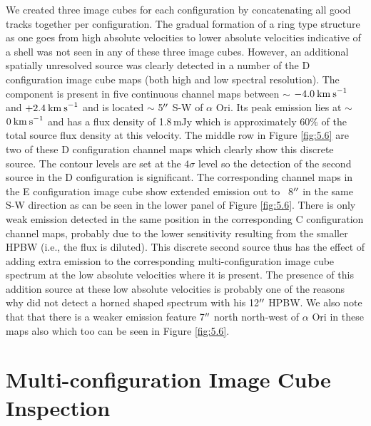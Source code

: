 We created three image cubes for each configuration by concatenating all good tracks together per configuration. The gradual formation of a ring type structure as one goes from high absolute velocities to lower absolute velocities indicative of a shell was not seen in any of these three image cubes. However, an additional spatially unresolved source was clearly detected in a number of the D configuration image cube maps (both high and low spectral resolution). The component is present in five continuous channel maps between $\sim$ $-4.0\>{\rm km\>s}^{-1}$ and $+2.4\>{\rm km\>s}^{-1}$ and is located $\sim$ 5$^{\prime\prime}$ S-W of $\alpha$ Ori. Its peak emission lies at $\sim$ $0\>{\rm km\>s}^{-1}$ and has a flux density of 1.8\,mJy which is approximately 60$\%$ of the total source flux density at this velocity. The middle row in Figure \ref{fig:5.6} are two of these D configuration channel maps which clearly show this discrete source. The contour levels are set at the $4\sigma$ level so the detection of the second source in the D configuration is significant. The corresponding channel maps in the E configuration image cube show extended emission out to ~8$^{\prime\prime}$ in the same S-W direction as can be seen in the lower panel of Figure \ref{fig:5.6}. There is only weak emission detected in the same position in the corresponding C configuration channel maps, probably due to the lower sensitivity resulting from the smaller HPBW (i.e., the flux is diluted). This discrete second source thus has the effect of adding extra emission to the corresponding multi-configuration image cube spectrum at the low absolute velocities where it is present. The presence of this addition source at these low absolute velocities is probably one of the reasons why \cite{huggins_1994} did not detect a horned shaped spectrum with his 12$^{\prime\prime}$ HPBW. We also note that that there is a weaker emission feature 7$^{\prime\prime}$ north north-west of $\alpha$ Ori in these maps also which too can be seen in Figure \ref{fig:5.6}. 

\section{Multi-configuration Image Cube Inspection}\label{sec:5.5}

